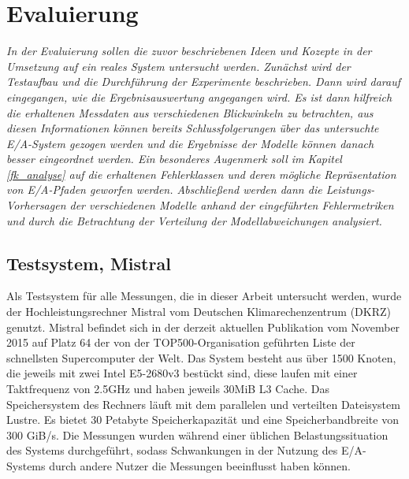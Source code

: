 \documentclass[
	12pt,
	a4paper,
	BCOR10mm,
	DIV14,
	listof=totoc,
	bibliography=totoc,
	headsepline
]{scrreprt}
\begin{document}
\chapter{Evaluierung}
\textit{%
	In der Evaluierung sollen die zuvor beschriebenen Ideen und Kozepte in der Umsetzung auf ein reales System untersucht werden.
	Zunächst wird der Testaufbau und die Durchführung der Experimente beschrieben.
	Dann wird darauf eingegangen, wie die Ergebnisauswertung angegangen wird.
	Es ist dann hilfreich die erhaltenen Messdaten aus verschiedenen Blickwinkeln zu betrachten, aus diesen Informationen können bereits Schlussfolgerungen über das untersuchte E/A-System gezogen werden und die Ergebnisse der Modelle können danach besser eingeordnet werden.
	Ein besonderes Augenmerk soll im Kapitel \ref{fk_analyse} auf die erhaltenen Fehlerklassen und deren mögliche Repräsentation von E/A-Pfaden geworfen werden.
	Abschließend werden dann die Leistungs-Vorhersagen der verschiedenen Modelle anhand der eingeführten Fehlermetriken und durch die Betrachtung der Verteilung der Modellabweichungen analysiert.
}
\bigskip

\section{Testsystem, Mistral}
\label{impl:testsystem}
Als Testsystem für alle Messungen, die in dieser Arbeit untersucht werden, wurde der Hochleistungsrechner Mistral vom Deutschen Klimarechenzentrum (DKRZ) genutzt.
Mistral befindet sich in der derzeit aktuellen Publikation vom November 2015 auf Platz 64 der von der TOP500-Organisation geführten Liste der schnellsten Supercomputer der Welt.
Das System besteht aus über 1500 Knoten, die jeweils mit zwei Intel E5-2680v3 bestückt sind, diese laufen mit einer Taktfrequenz von 2.5GHz und haben jeweils 30MiB L3 Cache.
Das Speichersystem des Rechners läuft mit dem parallelen und verteilten Dateisystem Lustre.
Es bietet 30 Petabyte Speicherkapazität und eine Speicherbandbreite von 300 GiB/s. Die Messungen wurden während einer üblichen Belastungssituation des Systems durchgeführt, sodass Schwankungen in der Nutzung des E/A-Systems durch andere Nutzer die Messungen beeinflusst haben können.
\end{document}
